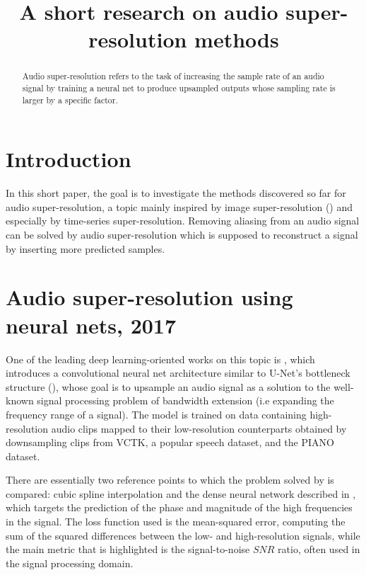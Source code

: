 \documentclass[conference]{IEEEtran}
\begin{document}
\title{A short research on audio super-resolution methods \\
}

\author{
}

\maketitle

\begin{abstract}
Audio super-resolution refers to the task of increasing the sample rate of an audio signal by training a neural net to produce upsampled outputs whose sampling rate is larger by a specific factor.
\end{abstract}

\section{Introduction}
	In this short paper, the goal is to investigate the methods discovered so far for audio super-resolution, a topic mainly inspired by image super-resolution (\textcite{ledig2017photorealistic}) and especially by time-series super-resolution. Removing aliasing from an audio signal can be solved by audio super-resolution which is supposed to reconstruct a signal by inserting more predicted samples.
\\

\section{Audio super-resolution using neural nets, 2017}

	One of the leading deep learning-oriented works on this topic is \textcite{kuleshov2017audio}, which introduces a convolutional neural net architecture similar to U-Net's bottleneck structure (\textcite{ronneberger2015unet}), whose goal is to upsample an audio signal as a solution to the well-known signal processing problem of bandwidth extension (i.e expanding the frequency range of a signal). The model is trained on data containing high-resolution audio clips mapped to their low-resolution counterparts obtained by downsampling clips from VCTK, a popular speech dataset, and the PIANO dataset. 

	There are essentially two reference points to which the problem solved by \textcite{kuleshov2017audio} is compared: cubic spline interpolation and the dense neural network described in \textcite{lietal2015}, which targets the prediction of the phase and magnitude of the high frequencies in the signal. The loss function used is the mean-squared error, computing the sum of the squared differences between the low- and high-resolution signals, while the main metric that is highlighted is the signal-to-noise $ SNR $ ratio, often used in the signal processing domain. 
\end{document}
